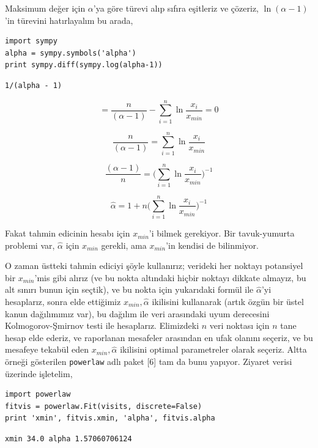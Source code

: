 \documentclass[12pt,fleqn]{article}\usepackage{../../common}
\begin{document}
Maksimum değer için $\alpha$'ya göre türevi alıp sıfıra eşitleriz ve
çözeriz, $\ln(\alpha-1)$'in türevini hatırlayalım bu arada,

\begin{verbatim}
import sympy
alpha = sympy.symbols('alpha')
print sympy.diff(sympy.log(alpha-1))
\end{verbatim}

\begin{verbatim}
1/(alpha - 1)
\end{verbatim}

$$ =  \frac{n}{(\alpha - 1)} - \sum_{i=1}^{n}  \ln \frac{x_i}{x_{min}}  = 0 $$

$$  \frac{n}{(\alpha - 1)} = \sum_{i=1}^{n}  \ln \frac{x_i}{x_{min}}   $$

$$ \frac{(\alpha - 1)}{n} =  \bigg( \sum_{i=1}^{n}  \ln \frac{x_i}{x_{min}} \bigg)^{-1}  $$

$$ \hat{\alpha} =  1 + n  \bigg( \sum_{i=1}^{n}  \ln \frac{x_i}{x_{min}} \bigg)^{-1}   $$

Fakat tahmin edicinin hesabı için $x_{min}$'i bilmek gerekiyor. Bir
tavuk-yumurta problemi var, $\hat{\alpha}$ için $x_{min}$ gerekli, ama
$x_{min}$'in kendisi de bilinmiyor. 

O zaman üstteki tahmin ediciyi şöyle kullanırız; verideki her noktayı potansiyel
bir $x_{min}$'mis gibi alırız (ve bu nokta altındaki hiçbir noktayı dikkate
almayız, bu alt sınırı bunun için seçtik), ve bu nokta için yukarıdaki formül
ile $\hat{\alpha}$'yi hesaplarız, sonra elde ettiğimiz $x_{min}, \hat{\alpha}$
ikilisini kullanarak (artık özgün bir üstel kanun dağılımımız var), bu dağılım
ile veri arasındaki uyum derecesini Kolmogorov-Şmirnov testi ile
hesaplarız. Elimizdeki $n$ veri noktası için $n$ tane hesap elde ederiz, ve
raporlanan mesafeler arasından en ufak olanını seçeriz, ve bu mesafeye tekabül
eden $x_{min},\hat{\alpha}$ ikilisini optimal parametreler olarak seçeriz. Altta
örneği gösterilen \verb!powerlaw!  adlı paket [6] tam da bunu yapıyor. Ziyaret
verisi üzerinde işletelim,

\begin{verbatim}
import powerlaw
fitvis = powerlaw.Fit(visits, discrete=False)
print 'xmin', fitvis.xmin, 'alpha', fitvis.alpha
\end{verbatim}

\begin{verbatim}
xmin 34.0 alpha 1.57060706124
\end{verbatim}
\end{document}

